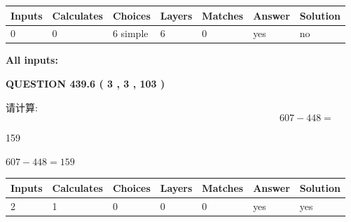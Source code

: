 \documentclass{ctexart}
\begin{document}
 
   
   
   
   
\noindent\begin{tabular}{|l|l|l|l|l|l|l|}
 \hline
Inputs & Calculates & Choices & Layers & Matches & Answer & Solution \\ \hline
 0  & 
 0  & 
 6
  simple  
  & 
 6  & 
 0  & 
  yes & 
  no 
  \\ \hline
 \end{tabular}
   
   
   
   
\noindent{}
   
   
   
   
\noindent\vspace{0.1in}\hspace{-0.08in} {\textbf{\Large{All inputs: }}}
   
   
  
\vspace{0.2in}
  
{\textbf{\Large{QUESTION
439.6 
 ( 3 , 3 , 103 )
}}}
  
  
 
请计算:
\begin{equation}
607 -   %
448 = \nonumber
\end{equation}
 
 
 
\noindent{}
 
 

159
 
 
\noindent{}
 
 

 
 
 
\noindent{}
 
 

$ %
607 -  %
448=   %
159$
 
 
\noindent{}
 
 

 
   
   
   
   
\noindent\begin{tabular}{|l|l|l|l|l|l|l|}
 \hline
Inputs & Calculates & Choices & Layers & Matches & Answer & Solution \\ \hline
 2  & 
 1  & 
 0
  & 
 0  & 
 0  & 
  yes & 
  yes 
  \\ \hline
 \end{tabular}
   
\end{document}
